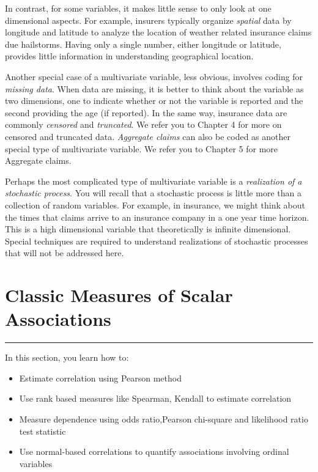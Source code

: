 \documentclass[]{book}
\providecommand{\tightlist}{%
  \setlength{\itemsep}{0pt}\setlength{\parskip}{0pt}}
\theoremstyle{definition}
\theoremstyle{definition}
\theoremstyle{definition}
\theoremstyle{remark}
\begin{document}
In contrast, for some variables, it makes little sense to only look at
one dimensional aspects. For example, insurers typically organize
\emph{spatial} data by longitude and latitude to analyze the location of
weather related insurance claims due hailstorms. Having only a single
number, either longitude or latitude, provides little information in
understanding geographical location.

Another special case of a multivariate variable, less obvious, involves
coding for \emph{missing data}. When data are missing, it is better to
think about the variable as two dimensions, one to indicate whether or
not the variable is reported and the second providing the age (if
reported). In the same way, insurance data are commonly \emph{censored}
and \emph{truncated}. We refer you to Chapter 4 for more on censored and
truncated data. \emph{Aggregate claims} can also be coded as another
special type of multivariate variable. We refer you to Chapter 5 for
more Aggregate claims.

Perhaps the most complicated type of multivariate variable is a
\emph{realization of a stochastic process}. You will recall that a
stochastic process is little more than a collection of random variables.
For example, in insurance, we might think about the times that claims
arrive to an insurance company in a one year time horizon. This is a
high dimensional variable that theoretically is infinite dimensional.
Special techniques are required to understand realizations of stochastic
processes that will not be addressed here.

\section{Classic Measures of Scalar Associations}\label{S:Measures}

\begin{center}\rule{0.5\linewidth}{\linethickness}\end{center}

In this section, you learn how to:

\begin{itemize}
\tightlist
\item
  Estimate correlation using Pearson method
\item
  Use rank based measures like Spearman, Kendall to estimate correlation
\item
  Measure dependence using odds ratio,Pearson chi-square and likelihood
  ratio test statistic
\item
  Use normal-based correlations to quantify associations involving
  ordinal variables
\end{itemize}
\end{document}
